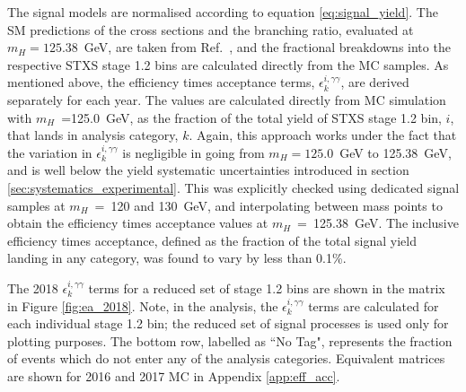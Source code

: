 The signal models are normalised according to equation \ref{eq:signal_yield}. The SM predictions of the cross sections and the \Hgg branching ratio, evaluated at $m_H=125.38$~GeV, are taken from Ref.~\cite{deFlorian:2016spz}, and the fractional breakdowns into the respective STXS stage 1.2 bins are calculated directly from the MC samples. As mentioned above, the efficiency times acceptance terms, $\epsilon^{i,\gamma\gamma}_{k}$, are derived separately for each year. The values are calculated directly from MC simulation with $m_H$~=125.0~GeV, as the fraction of the total yield of STXS stage 1.2 bin, $i$, that lands in analysis category, $k$. Again, this approach works under the fact that the variation in $\epsilon^{i,\gamma\gamma}_{k}$ is negligible in going from $m_H=125.0$~GeV to 125.38~GeV, and is well below the yield systematic uncertainties introduced in section \ref{sec:systematics_experimental}. This was explicitly checked using dedicated signal samples at $m_H$~=~120 and 130~GeV, and interpolating between mass points to obtain the efficiency times acceptance values at $m_H$~=~125.38~GeV. The inclusive efficiency times acceptance, defined as the fraction of the total signal yield landing in any category, was found to vary by less than 0.1\%.

The 2018 $\epsilon^{i,\gamma\gamma}_{k}$ terms for a reduced set of stage 1.2 bins are shown in the matrix in Figure \ref{fig:ea_2018}. Note, in the analysis, the $\epsilon^{i,\gamma\gamma}_{k}$ terms are calculated for each individual stage 1.2 bin; the reduced set of signal processes is used only for plotting purposes. The bottom row, labelled as ``No Tag", represents the fraction of events which do not enter any of the analysis categories. Equivalent matrices are shown for 2016 and 2017 MC in Appendix \ref{app:eff_acc}.

